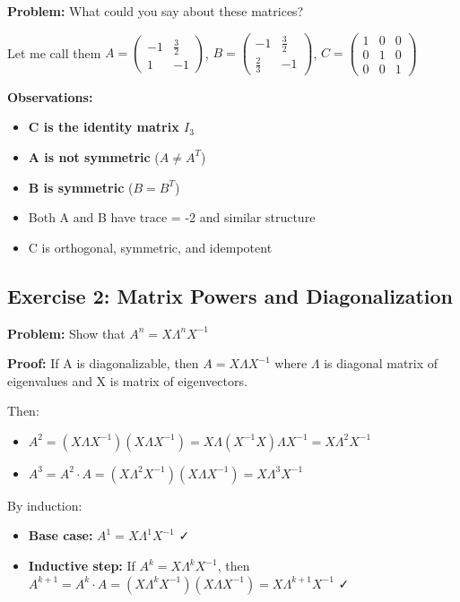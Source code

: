 \documentclass[12pt,a4paper]{article}
\begin{document}
\textbf{Problem:} What could you say about these matrices?

Let me call them $A = \begin{pmatrix} -1 & \frac{3}{2} \\ 1 & -1 \end{pmatrix}$, $B = \begin{pmatrix} -1 & \frac{3}{2} \\ \frac{2}{3} & -1 \end{pmatrix}$, $C = \begin{pmatrix} 1 & 0 & 0 \\ 0 & 1 & 0 \\ 0 & 0 & 1 \end{pmatrix}$

\textbf{Observations:}
\begin{itemize}
    \item \textbf{C is the identity matrix $I_3$}
    \item \textbf{A is not symmetric} ($A \neq A^T$)
    \item \textbf{B is symmetric} ($B = B^T$)
    \item Both A and B have trace = -2 and similar structure
    \item C is orthogonal, symmetric, and idempotent
\end{itemize}

\subsection{Exercise 2: Matrix Powers and Diagonalization}

\textbf{Problem:} Show that $A^n = X\Lambda^nX^{-1}$

\textbf{Proof:}
If A is diagonalizable, then $A = X\Lambda X^{-1}$ where $\Lambda$ is diagonal matrix of eigenvalues and X is matrix of eigenvectors.

Then:
\begin{itemize}
    \item $A^2 = (X\Lambda X^{-1})(X\Lambda X^{-1}) = X\Lambda(X^{-1}X)\Lambda X^{-1} = X\Lambda^2X^{-1}$
    \item $A^3 = A^2 \cdot A = (X\Lambda^2X^{-1})(X\Lambda X^{-1}) = X\Lambda^3X^{-1}$
\end{itemize}

By induction:
\begin{itemize}
    \item \textbf{Base case:} $A^1 = X\Lambda^1X^{-1}$ ✓
    \item \textbf{Inductive step:} If $A^k = X\Lambda^kX^{-1}$, then $A^{k+1} = A^k \cdot A = (X\Lambda^kX^{-1})(X\Lambda X^{-1}) = X\Lambda^{k+1}X^{-1}$ ✓
\end{itemize}
\end{document}
